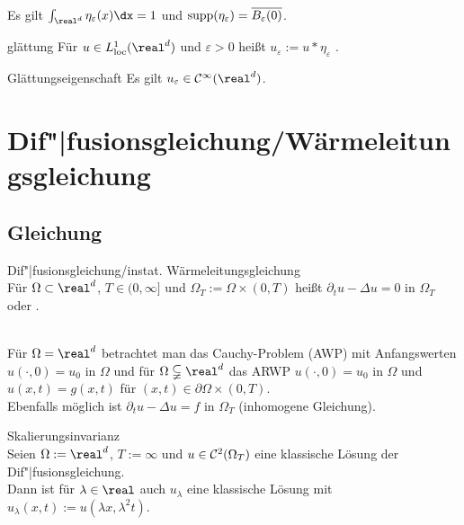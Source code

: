 \begin{Bem}
    Es gilt $\int_{\real^d} \eta_\varepsilon(x) \dx = 1$ und
    $\operatorname{supp}(\eta_\varepsilon) = \overline{B_\varepsilon(0)}$.
\end{Bem}

\begin{Def}{glättung}
    Für $u \in L^1_\loc(\real^d)$ und $\varepsilon > 0$ heißt
    $u_\varepsilon := u \ast \eta_\varepsilon$ .
\end{Def}

\begin{Lemma}{Glättungseigenschaft}
    Es gilt $u_\varepsilon \in \C^\infty(\real^d)$.
\end{Lemma}

\pagebreak

\section{%
    Dif"|fusionsgleichung/Wärmeleitungsgleichung%
}

\subsection{%
    Gleichung%
}

\begin{Def}{Dif"|fusionsgleichung/instat. Wärmeleitungsgleichung}\\
    Für $\Omega \subset \real^d$, $T \in (0, \infty]$ und $\Omega_T := \Omega \times (0, T)$
    heißt $\partial_t u - \Delta u = 0$ in $\Omega_T$
     oder .
\end{Def}

\begin{Bem}\\
    Für $\Omega = \real^d$ betrachtet man das Cauchy-Problem (AWP) mit Anfangswerten
    $u(\cdot, 0) = u_0$ in $\Omega$ und
    für $\Omega \subsetneqq \real^d$ das ARWP
    $u(\cdot, 0) = u_0$ in $\Omega$ und
    $u(x, t) = g(x, t)$ für $(x, t) \in \partial\Omega \times (0, T)$.\\
    Ebenfalls möglich ist $\partial_t u - \Delta u = f$ in $\Omega_T$ (inhomogene Gleichung).
\end{Bem}

\linie

\begin{Satz}{Skalierungsinvarianz}\\
    Seien $\Omega := \real^d$, $T := \infty$ und $u \in \mathcal{C}^2(\Omega_T)$ eine klassische
    Lösung der Dif"|fusionsgleichung.\\
    Dann ist für $\lambda \in \real$ auch $u_\lambda$ eine klassische Lösung
    mit $u_\lambda(x, t) := u(\lambda x, \lambda^2 t)$.
\end{Satz}


